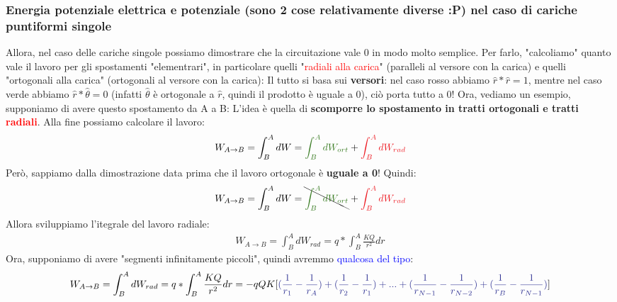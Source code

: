         \subsubsection{Energia potenziale elettrica e potenziale (sono 2 cose relativamente diverse :P) nel caso di cariche puntiformi singole}
            Allora, nel caso delle cariche singole possiamo dimostrare che la circuitazione vale 0 in modo molto semplice. Per farlo, "calcoliamo" quanto vale il lavoro per gli spostamenti "elementrari", in particolare quelli "\textcolor{Red}{radiali alla carica}" (paralleli al versore con la carica) e quelli "\textcolor{OliveGreen}{ortogonali alla carica}" (ortogonali al versore con la carica):
            Il tutto si basa sui \textbf{versori}: nel caso rosso abbiamo $\hat{r}*\hat{r} = 1$, mentre nel caso verde abbiamo $\hat{r}*\hat{\theta} = 0$ (infatti $\hat{\theta}$ è ortogonale a $\hat{r}$, quindi il prodotto è uguale a 0), ciò porta tutto a 0!
            Ora, vediamo un esempio, supponiamo di avere questo spostamento da A a B:
            L'idea è quella di \textbf{scomporre lo spostamento in tratti \textcolor{OliveGreen}{ortogonali} e tratti \textcolor{Red}{radiali}}. Alla fine possiamo calcolare il lavoro:
            \begin{align*}
                W_{A\rightarrow B} = \int_B^AdW=\textcolor{OliveGreen}{\int_B^AdW_{ort}} + \textcolor{Red}{\int_B^AdW_{rad}}
            \end{align*}
            Però, sappiamo dalla dimostrazione data prima che il lavoro ortogonale è \textbf{uguale a 0}! Quindi:
            \begin{align*}
                W_{A\rightarrow B} = \int_B^AdW=\bcancel{\textcolor{OliveGreen}{\int_B^AdW_{ort}} }+ \textcolor{Red}{\int_B^AdW_{rad}}
            \end{align*}
            Allora sviluppiamo l'itegrale del lavoro radiale:
            \begin{align*}
                W_{A\rightarrow B} = \int_B^AdW_{rad} =q*\int^A_B\frac{KQ}{r^2}dr
            \end{align*}
            Ora, supponiamo di avere "segmenti infinitamente piccoli", quindi avremmo \textcolor{Blue}{qualcosa del tipo}:
            \begin{align*}
                W_{A\rightarrow B} = \int_B^AdW_{rad} =q*\int^A_B\frac{KQ}{r^2}dr = -qQK[\textcolor{Blue}{(\frac{1}{r_1}-\frac{1}{r_A})+(\frac{1}{r_2}-\frac{1}{r_1})+...+(\frac{1}{r_{N-1}}-\frac{1}{r_{N-2}})+(\frac{1}{r_{B}}-\frac{1}{r_{N-1}})}]
            \end{align*}

